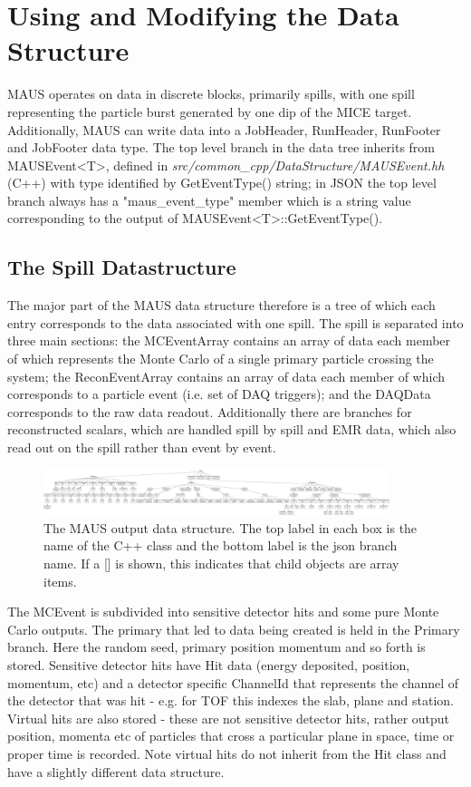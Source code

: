 \chapter{Using and Modifying the Data Structure}
\label{chapter:data_structure}
MAUS operates on data in discrete blocks, primarily spills, with one spill representing the particle burst generated by one dip of the MICE target. Additionally, MAUS can write data into a JobHeader, RunHeader, RunFooter and JobFooter data type. The top level branch in the data tree inherits from MAUSEvent<T>, defined in \emph{src/common_cpp/DataStructure/MAUSEvent.hh} (C++) with type identified by GetEventType() string; in JSON the top level branch always has a "maus_event_type" member which is a string value corresponding to the output of MAUSEvent<T>::GetEventType().

\section{The Spill Datastructure}
The major part of the MAUS data structure therefore is a tree of which each entry corresponds to the data associated with one spill. The spill is separated into three main sections: the MCEventArray contains an array of data each member of which represents the Monte Carlo of a single primary particle crossing the system; the ReconEventArray contains an array of data each member of which corresponds to a particle event (i.e. set of DAQ triggers); and the DAQData corresponds to the raw data readout. Additionally there are branches for reconstructed scalars, which are handled spill by spill and EMR data, which also read out on the spill rather than event by event.

\begin{figure}[!htb]
\centering
\includegraphics[width=0.9\textwidth]{data_structure.png}
\caption{The MAUS output data structure. The top label in each box is the name of the C++ class and the bottom label is the json branch name. If a [] is shown, this indicates that child objects are array items.}
\end{figure}

The MCEvent is subdivided into sensitive detector hits and some pure Monte Carlo outputs. The primary that led to data being created is held in the Primary branch. Here the random seed, primary position momentum and so forth is stored. Sensitive detector hits have Hit data (energy deposited, position, momentum, etc) and a detector specific ChannelId that represents the channel of the detector that was hit - e.g. for TOF this indexes the slab, plane and station. Virtual hits are also stored - these are not sensitive detector hits, rather output position, momenta etc of particles that cross a particular plane in space, time or proper time is recorded. Note virtual hits do not inherit from the Hit class and have a slightly different data structure.

